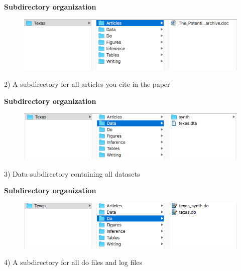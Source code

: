 \documentclass[notes=show]{beamer}
\begin{document}
\begin{frame}[plain]
\begin{center}
\textbf{Subdirectory organization}
\end{center}

\begin{figure}
\includegraphics[scale=0.5]{./lecture_includes/articles.png}
\end{figure}

2) A subdirectory for all articles you cite in the paper

\end{frame}

\begin{frame}[plain]
\begin{center}
\textbf{Subdirectory organization}
\end{center}

\begin{figure}
\includegraphics[scale=0.5]{./lecture_includes/data.png}
\end{figure}

3) Data subdirectory containing all datasets

\end{frame}

\begin{frame}[plain]
\begin{center}
\textbf{Subdirectory organization}
\end{center}

\begin{figure}
\includegraphics[scale=0.5]{./lecture_includes/do.png}
\end{figure}

4) A subdirectory for all do files and log files
\end{frame}
\end{document}

